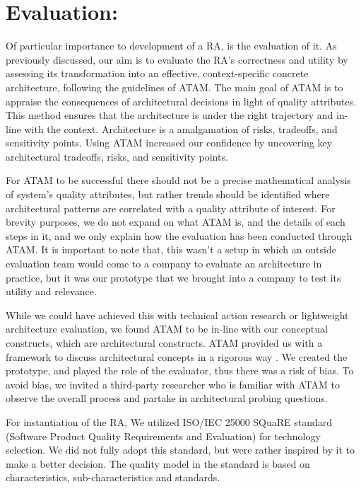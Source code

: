 \documentclass[review]{elsarticle}
\begin{document}
\section{Evaluation:} \label{evaluation-section}

Of particular importance to development of a RA, is the evaluation of it. As previously discussed, our aim is to evaluate the RA's correctness and utility by assessing its transformation into an effective, context-specific concrete architecture, following the guidelines of ATAM. The main goal of ATAM is to appraise the consequences of architectural decisions in light of quality attributes. This method ensures that the architecture is under the right trajectory and in-line with the context. Architecture is a amalgamation of risks, tradeoffs, and sensitivity points. Using ATAM increased our confidence by uncovering key architectural tradeoffs, risks, and sensitivity points.

For ATAM to be successful there should not be a precise mathematical analysis of system's quality attributes, but rather trends should be identified where architectural patterns are correlated with a quality attribute of interest. For brevity purposes, we do not expand on what ATAM is, and the details of each steps in it, and we only explain how the evaluation has been conducted through ATAM. It is important to note that, this wasn't a setup in which an outside evaluation team would come to a company to evaluate an architecture in practice, but it was our prototype that we brought into a company to test its utility and relevance. 

While we could have achieved this with technical action research or lightweight architecture evaluation, we found ATAM to be in-line with our conceptual constructs, which are architectural constructs. ATAM provided us with a framework to discuss architectural concepts in a rigorous way \cite{wieringa2014design}. We created the prototype, and played the role of the evaluator, thus there was a risk of bias. To avoid bias, we invited a third-party researcher who is familiar with ATAM to observe the overall process and partake in architectural probing questions. 

For instantiation of the RA, We utilized ISO/IEC 25000 SQuaRE standard (Software Product Quality Requirements and Evaluation) \cite{ISO25000} for technology selection.  We did not fully adopt this standard, but were rather inspired by it to make a better decision. The quality model in the standard is based on characteristics, sub-characteristics and standards.
\end{document}
